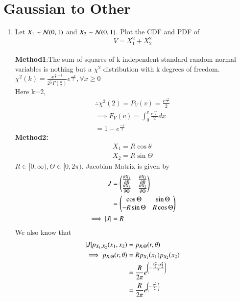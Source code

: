 \documentclass[journal,12pt,twocolumn]{IEEEtran}
\renewcommand\thesection{\arabic{section}}
\begin{document}
\section{Gaussian to Other}
\begin{enumerate}[label=\thesection.\arabic*
,ref=\thesection.\theenumi]
\item
Let $X_1 \sim  \mathcal{N}(0, 1)$ and $X_2 \sim  \mathcal{N}(0, 1)$. Plot the CDF and PDF of
%
\begin{equation}
V = X_1^2 + X_2^2
\end{equation}
%
\solution \\
\textbf{Method1}:The sum of squares of k independent standard random normal variables is nothing but a  $\chi^2$ distribution with k degrees of freedom.\\
$\chi^{2} (k)= \frac{x^{\frac{n}{2} -1}}{2^{\frac{n}{2}} \Gamma(
\frac{n}{2})} e^{\frac{-x}{2}}, \forall x\geq 0$\\
Here k=2,
\begin{align}
\therefore \chi^{2} (2)=P_{V}(v)=\frac{ e^{\frac{-x}{2}}}{2}\\
\implies F_{V}(v)=\int_{0}^{v} \frac{ e^{\frac{-x}{2}}}{2} dx\\
=1-e^{\frac{-x}{2}}
\label{eq:eq6}
\end{align}
\textbf{Method2:}\begin{align}
			X_1 = R\cos{\theta} \\
			X_2 = R\sin{\Theta}
		\end{align}
 $R \in [0, \infty), \Theta \in [0, 2\pi)$.  Jacobian Matrix is given by
		\begin{align}
			J &= \begin{pmatrix}\frac{\partial X_1}{\partial R} & \frac{\partial X_2}{\partial R} \\
						\frac{\partial X_1}{\partial \Theta} & \frac {\partial X_2}{\partial \Theta}\end{pmatrix} \\
					&= \begin{pmatrix}\cos{\Theta} & \sin{\Theta} \\
							  -R\sin{\Theta} & R\cos{\Theta}\end{pmatrix} \\
			\implies |J| &= R
		\end{align}
We also know that
		\begin{align}
			|J|p_{X_1, X_2}(x_1, x_2) &= p_{R, \Theta}(r, \theta) \\
			\implies p_{R, \Theta}(r, \theta) &= Rp_{X_1}(x_1)p_{X_2}(x_2)\\
			&= \frac{R}{2\pi}e^{\brak{-\frac{X_1^2 + X_2^2}{2}}} \\
			&= \frac{R}{2\pi}e^{\brak{-\frac{R^2}{2}}}
			\label{eq:joint}

\end{align}
\end{enumerate}
\end{document}
